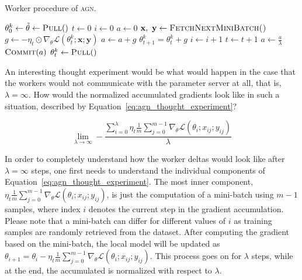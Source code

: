\begin{algorithm}[H]
  \caption{Worker procedure of \textsc{agn}.}
  \label{algo:agn}
  \begin{algorithmic}[1]
    \State $\theta^k_0 \gets \tilde{\theta} \gets \Call{Pull}$
    \State $t \gets 0$
    \State $i \gets 0$
    \State $a \gets 0$
    \State $\textbf{x},~\textbf{y} \gets \Call{FetchNextMiniBatch()}{}$
    \State $g \gets -\eta_t \odot \nabla_\theta \mathcal{L}(\theta^k_t;\textbf{x};\textbf{y})$
    \State $a \gets a + g$
    \State $\theta^k_{t + 1} = \theta^k_t + g$
    \State $i \gets i + 1$
    \State $t \gets t + 1$
    \EndWhile
    \State $a \gets \frac{a}{\lambda}$ 
    \State $\Call{Commit}{a}$
    \State $\theta^k_{t} \gets \Call{Pull}$
    \EndWhile
    \EndProcedure
  \end{algorithmic}
\end{algorithm}

An interesting thought experiment would be what would happen in the case that the workers would not communicate with the parameter server at all, that is, $\lambda = \infty$. How would the normalized accumulated gradients look like in such a situation, described by Equation~\ref{eq:agn_thought_experiment}?

\begin{equation}
  \label{eq:agn_thought_experiment}
  \lim_{\lambda \to \infty} -\frac{\sum_{i = 0}^\lambda \eta_t \frac{1}{m}\sum_{j = 0}^{m - 1} \nabla_\theta \mathcal{L}(\theta_i;x_{ij};y_{ij})}{\lambda}
\end{equation}

In order to completely understand how the worker deltas would look like after $\lambda = \infty$ steps, one first needs to understand the individual components of Equation~\ref{eq:agn_thought_experiment}. The most inner component, $\eta_t \frac{1}{m}\sum_{j = 0}^{m - 1} \nabla_\theta \mathcal{L}(\theta_i;x_{ij};y_{ij})$, is just the computation of a mini-batch using $m - 1$ samples, where index $i$ denotes the current step in the gradient accumulation. Please note that a mini-batch can differ for different values of $i$ as training samples are randomly retrieved from the dataset. After computing the gradient based on the mini-batch, the local model will be updated as $\theta_{i + 1} = \theta_i - \eta_t\frac{1}{m}\sum_{j = 0}^{m - 1} \nabla_\theta \mathcal{L}(\theta_i;x_{ij};y_{ij})$. This process goes on for $\lambda$ steps, while at the end, the accumulated is normalized with respect to $\lambda$.\\

